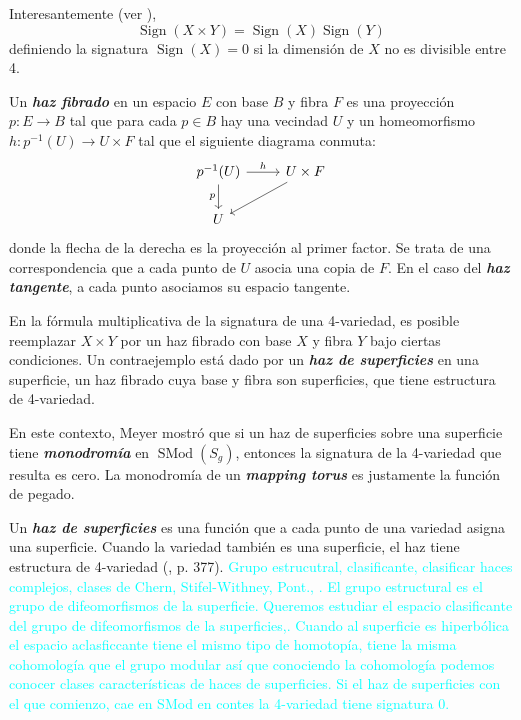 \documentclass[spanish]{article}
\theoremstyle{definition}
\DeclareMathOperator{\SMod}{SMod}
\begin{document}
 Interesantemente (ver \cite{Atiyah}), 
 \[\operatorname{Sign}(X\times Y)=\operatorname{Sign}(X)\operatorname{Sign}(Y)\]
 definiendo la signatura $\operatorname{Sign}(X)=0$ si la dimensión de $X$ no es divisible entre 4.
 
 Un \textbf{\textit{haz fibrado}} en un espacio $E$ con base $B$ y fibra $F$ es una proyección $p:E\to B$ tal que para cada $p\in B$ hay una vecindad $U$ y un homeomorfismo $h:p^{-1}(U)\to U\times F$ tal que el siguiente diagrama conmuta:
 \[\begin{tikzcd}
 	p^{-1}(U)\arrow[r,"h"]\arrow[d,"p",swap]&U\times F\arrow[ld]\\
 	U
 \end{tikzcd}\]
 donde la flecha de la derecha es la proyección al primer factor. Se trata de una correspondencia que a cada punto de $U$ asocia una copia de $F$. En el caso del \textbf{\textit{haz tangente}}, a cada punto asociamos su espacio tangente.
 
 En la fórmula multiplicativa de la signatura de una 4-variedad, es posible reemplazar $X\times Y$ por un haz fibrado con base $X$ y fibra $Y$ bajo ciertas condiciones. Un contraejemplo está dado por un \textbf{\textit{haz de superficies}} en una superficie, un haz fibrado cuya base y fibra son superficies, que tiene estructura de 4-variedad.
 
 En este contexto, Meyer mostró que si un haz de superficies sobre una superficie tiene \textbf{\textit{monodromía}} en $\SMod(S_g)$, entonces la signatura de la 4-variedad que resulta es cero. La monodromía de un \textbf{\textit{mapping torus}} es justamente la función de pegado.
 

\iffalse
Un \textbf{\textit{haz de superficies}} es una función que a cada punto de una variedad asigna una superficie. Cuando la variedad también es una superficie, el haz tiene estructura de 4-variedad (\cite{hatcher}, p. 377). \textcolor{cyan}{Grupo estrucutral, clasificante, clasificar haces complejos, clases de Chern, Stifel-Withney, Pont., . El grupo estructural es el grupo de difeomorfismos de la superficie. Queremos estudiar el espacio clasificante del grupo de difeomorfismos de la superficies,. Cuando al superficie es hiperbólica el espacio aclasficcante tiene el mismo tipo de homotopía, tiene la misma cohomología que el grupo modular así que conociendo la cohomología podemos conocer clases características de haces de superficies. Si el haz de superficies con el que comienzo, cae en SMod en contes la 4-variedad tiene signatura 0.}
\end{document}
